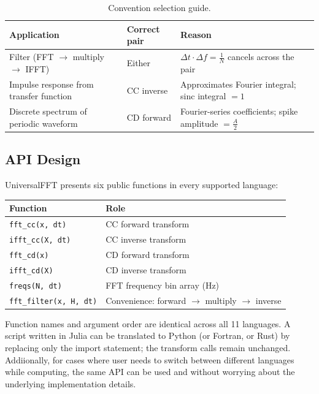 \documentclass[12pt,a4paper]{article}
\begin{document}
\begin{table}[h!]
\caption{Convention selection guide.}
\label{tab:selection}
\centering
\begin{tabular}{@{}llp{6cm}@{}}
\toprule
\textbf{Application} & \textbf{Correct pair} & \textbf{Reason} \\
\midrule
Filter (FFT $\to$ multiply $\to$ IFFT) & Either &
  $\Delta t \cdot \Delta f = \frac{1}{N}$ cancels across the pair \\
Impulse response from transfer function & CC inverse &
  Approximates Fourier integral; sinc integral $= 1$ \\
Discrete spectrum of periodic waveform & CD forward &
  Fourier-series coefficients; spike amplitude $= \frac{A}{2}$ \\
\bottomrule
\end{tabular}
\end{table}

\subsection{API Design}

UniversalFFT presents six public functions in every supported language:

\begin{center}
\begin{tabular}{@{}ll@{}}
\toprule
\textbf{Function} & \textbf{Role} \\
\midrule
\texttt{fft\_cc(x, dt)}      & CC forward transform \\
\texttt{ifft\_cc(X, dt)}     & CC inverse transform \\
\texttt{fft\_cd(x)}          & CD forward transform \\
\texttt{ifft\_cd(X)}         & CD inverse transform \\
\texttt{freqs(N, dt)}        & FFT frequency bin array (Hz) \\
\texttt{fft\_filter(x, H, dt)} & Convenience: forward $\to$ multiply $\to$ inverse \\
\bottomrule
\end{tabular}
\end{center}

Function names and argument order are identical across all 11 languages. A script
written in Julia can be translated to Python (or Fortran, or Rust) by replacing
only the import statement; the transform calls remain unchanged. Addiionally, for cases where user needs
to switch between different languages while computing, the same API can be used and without worrying about 
the underlying implementation details.
\end{document}
